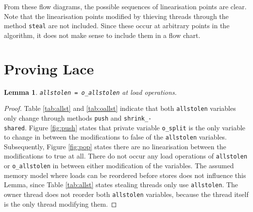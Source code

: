 \documentclass{sig-alternate-br}
\newtheorem{lemma}{Lemma}
\begin{document}
From these flow diagrams, the possible sequences of linearisation points are clear.
Note that the linearisation points modified by thieving threads through the method \texttt{steal} are not included.
Since these occur at arbitrary points in the algorithm, it does not make sense to include them in a flow chart.

\section{Proving Lace}
\begin{lemma}
	\texttt{allstolen = o\_allstolen} at load operations.
	\label{lem:allstolen}
\end{lemma}
\begin{proof}
	Table \ref{tab:allst} and \ref{tab:oallst} indicate that both \texttt{allstolen} variables only change through methods \texttt{push} and \texttt{shrink\_-\\shared}.
	Figure \ref{fig:push} states that private variable \texttt{o\_split} is the only variable to change in between the modifications to false of the \texttt{allstolen} variables.
	Subsequently, Figure \ref{fig:pop} states there are no linearisation between the modifications to true at all.
	There do not occur any load operations of \texttt{allstolen} or \texttt{o\_allstolen} in between either modification of the variables.
	The assumed memory model where loads can be reordered before stores does not influence this Lemma, since Table \ref{tab:allst} states stealing threads only use \texttt{allstolen}.
	The owner thread does not reorder both \texttt{allstolen} variables, because the thread itself is the only thread modifying them.
\end{proof}
\end{document}
